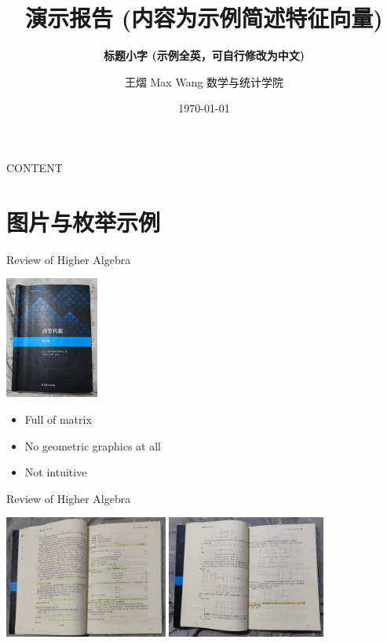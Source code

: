 \documentclass[10pt,aspectratio=43,mathserif,table]{beamer}
\title{演示报告 \quad(内容为示例简述特征向量)}
\subtitle{\fontsize{9pt}{14pt}\textbf{标题小字 \quad(示例全英，可自行修改为中文)}}
\author{王熠 \quad Max Wang \quad \newline \newline \fontsize{6pt}{10pt}数学与统计学院}
\institute{\fontsize{6pt}{10pt}Guangdong University of Tech.}
\date{\today}
\begin{document}

\frame{\titlepage}

\section[CONTENT]{}   %
\begin{frame}{CONTENT}
	\tableofcontents
\end{frame}

\section{图片与枚举示例}  %

\begin{frame}{Review of Higher Algebra}
	\begin{multicols}{2}
		\includegraphics[height=4cm]{fig/gaodai_cover.jpg}
		\begin{itemize}
			\item Full of matrix
			\item No geometric graphics at all
			\item Not intuitive
		\end{itemize}
	\end{multicols}
\end{frame}
\begin{frame}{Review of Higher Algebra}
	\begin{multicols}{2}
		\includegraphics[height=4cm]{fig/gaodai.jpg}
		\includegraphics[height=4cm]{fig/gaodai_mat.jpg}
	\end{multicols}
\end{frame}
\end{document}
